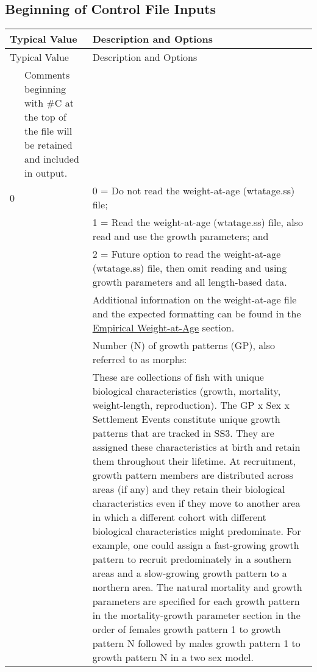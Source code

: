 \subsection{Beginning of Control File Inputs}
\begin{center}
	\begin{longtable}{p{0.5cm} p{2cm} p{12.5cm}}
		\hline
		\multicolumn{2}{l}{Typical Value} & Description and Options \Tstrut\Bstrut\\
		\hline
		\endfirsthead

		\hline
		\multicolumn{2}{l}{Typical Value} & Description and Options \Tstrut\Bstrut\\
		\hline
		\endhead

		\hline
		\endfoot

		\endlastfoot

		\multicolumn{2}{l}{\#C comment} \Tstrut & Comments beginning with \#C at the top of the file will be retained and included in output. \Bstrut\\
		\hline

		0 & & 0 = Do not read the weight-at-age (wtatage.ss) file; \Tstrut\\
		  & & 1 = Read the weight-at-age (wtatage.ss) file, also read and use the growth parameters; and \\
		  & & 2 = Future option to read the weight-at-age (wtatage.ss) file, then omit reading and using growth parameters and all length-based data. \\
		  & & Additional information on the weight-at-age file and the expected formatting can be found in the \hyperlink{WAA}{Empirical Weight-at-Age} section. \Bstrut\\

		\pagebreak
		1 & & Number (N) of growth patterns (GP), also referred to as morphs: \Tstrut\\
		& & These are collections of fish with unique biological characteristics (growth, mortality, weight-length, reproduction). The GP x Sex x Settlement Events constitute unique growth patterns that are tracked in SS3. They are assigned these characteristics at birth and retain them throughout their lifetime. At recruitment, growth pattern members are distributed across areas (if any) and they retain their biological characteristics even if they move to another area in which a different cohort with different biological characteristics might predominate. For example, one could assign a fast-growing growth pattern to recruit predominately in a southern areas and a slow-growing growth pattern to a northern area. The natural mortality and growth parameters are specified for each growth pattern in the mortality-growth parameter section in the order of females growth pattern 1 to growth pattern N followed by males growth pattern 1 to growth pattern N in a two sex model. \Bstrut\\


\end{longtable}
\end{center}
